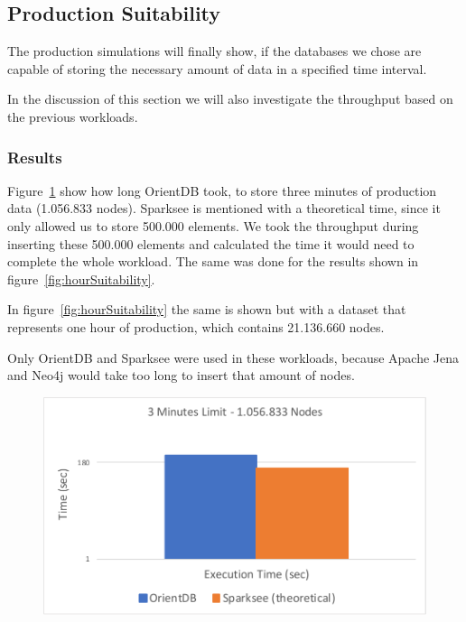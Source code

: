 \subsection{Production Suitability}
\label{ch:evaluation:se:productionSuitability}
The production simulations will finally show,
if the databases we chose are capable of storing the necessary amount of data in a specified time interval.

In the discussion of this section we will also investigate the throughput based on the previous workloads.

\subsubsection{Results}
Figure~\ref{fig:singleSuitability} show how long OrientDB took,
to store three minutes of production data (1.056.833 nodes).
Sparksee is mentioned with a theoretical time,
since it only allowed us to store 500.000 elements.
We took the throughput during inserting these 500.000 elements and calculated the time it would need to complete the whole workload.
The same was done for the results shown in figure~\ref{fig:hourSuitability}.

In figure~\ref{fig:hourSuitability} the same is shown but with a dataset that represents one hour of production,
which contains 21.136.660 nodes.

Only OrientDB and Sparksee were used in these workloads,
because Apache Jena and Neo4j would take too long to insert that amount of nodes.

\begin{figure}[h!]
  \centering
  \includegraphics[width=.75\textwidth]{images/production/singleSuitability}
  \label{fig:singleSuitability}
\end{figure}

